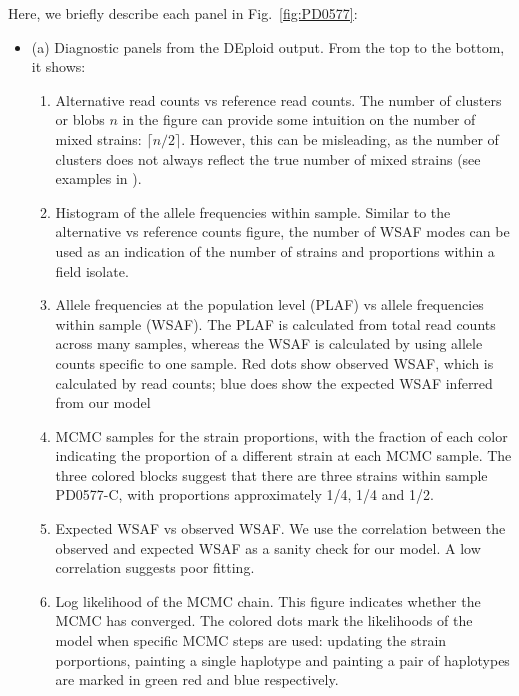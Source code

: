 \documentclass{article}
\begin{document}
Here, we briefly describe each panel in Fig.~\ref{fig:PD0577}:
\begin{itemize}
\item (a) Diagnostic panels from the DEploid output. From the top to the bottom, it shows:
\begin{enumerate}
\item Alternative read counts vs reference read counts. The number of clusters or blobs $n$ in the figure can provide some intuition on the number of mixed strains: $\lceil n/2\rceil$. However, this can be misleading, as the number of clusters does not always reflect the true number of mixed strains (see examples in \citet{Zhu2017}).

\item Histogram of the allele frequencies within sample. Similar to the alternative vs reference counts figure, the number of WSAF modes can be used as an indication of the number of strains and proportions within a field isolate.

\item Allele frequencies at the population level (PLAF) vs allele frequencies within sample (WSAF). The PLAF is calculated from total read counts across many samples, whereas the WSAF is calculated by using allele counts specific to one sample. Red dots show observed WSAF, which is calculated by read counts; blue does show the expected WSAF inferred from our model

\item MCMC samples for the strain proportions, with the fraction of each color indicating the proportion of a different strain at each MCMC sample. The three colored blocks suggest that there are three strains within sample {\textmd PD0577-C}, with proportions approximately 1/4, 1/4 and 1/2.

\item Expected WSAF vs observed WSAF. We use the correlation between the observed and expected WSAF as a sanity check for our model. A low correlation suggests poor fitting.

\item Log likelihood of the MCMC chain. This figure indicates whether the MCMC has converged. The colored dots mark the likelihoods of the model when specific MCMC steps are used: updating the strain porportions, painting a single haplotype and painting a pair of haplotypes are marked in green red and blue respectively.
\end{enumerate}


\end{itemize}
\end{document}
